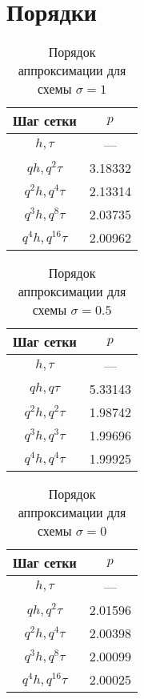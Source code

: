 \documentclass{article}
\begin{document}
\section{Порядки}
\begin{table}[H]
	\centering
	\caption{Порядок аппроксимации для схемы $\sigma = 1$}
	\begin{tabular}{|c|c|}
		\hline
		Шаг сетки & $p$ \\ \hline
		$h, \tau$ & --- \\ \hline 
		$q h, q^2 \tau$ &  3.18332 \\ \hline 
		$q^2 h, q^4 \tau$ & 2.13314 \\ \hline 
		$q^3 h, q^8 \tau$ & 2.03735 \\ \hline 
		$q^4 h, q^{16} \tau$ & 2.00962 \\ \hline 

	\end{tabular}
\end{table}

\begin{table}[H]
	\centering
	\caption{Порядок аппроксимации для схемы $\sigma = 0.5$}
	\begin{tabular}{|c|c|}
		\hline
		Шаг сетки & $p$ \\ \hline
		$h, \tau$ & --- \\ \hline 
		$q h, q \tau$ &  5.33143 \\ \hline 
		$q^2 h, q^2 \tau$ & 1.98742 \\ \hline 
		$q^3 h, q^3 \tau$ & 1.99696 \\ \hline 
		$q^4 h, q^{4} \tau$ & 1.99925 \\ \hline 

	\end{tabular}
\end{table}

\begin{table}[H]
	\centering
	\caption{Порядок аппроксимации для схемы $\sigma = 0$}
	\begin{tabular}{|c|c|}
		\hline
		Шаг сетки & $p$ \\ \hline
		$h, \tau$ & --- \\ \hline 
		$q h, q^2 \tau$ &  2.01596 \\ \hline 
		$q^2 h, q^4 \tau$ & 2.00398 \\ \hline 
		$q^3 h, q^8 \tau$ & 2.00099 \\ \hline 
		$q^4 h, q^{16} \tau$ & 2.00025 \\ \hline 

	\end{tabular}
\end{table}
\end{document}
